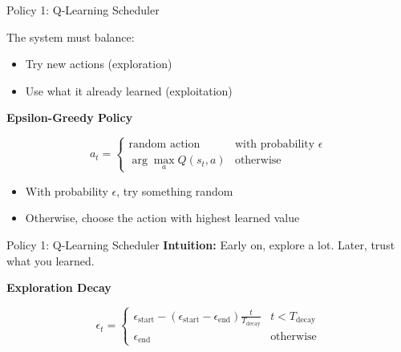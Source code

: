 \documentclass[Serif, 10pt, brown]{beamer}
\theoremstyle{example}
\theoremstyle{plain}
\begin{document}
\begin{frame}{Policy 1: Q-Learning Scheduler}

The system must balance:
\begin{itemize}
    \item Try new actions (exploration)
    \item Use what it already learned (exploitation)
\end{itemize}

\vspace{0.3cm}

\textbf{Epsilon-Greedy Policy}

\[
a_t =
\begin{cases}
\text{random action} & \text{with probability } \epsilon \\
\arg\max_{a} Q(s_t, a) & \text{otherwise}
\end{cases}
\]

\begin{itemize}
    \item With probability $\epsilon$, try something random
    \item Otherwise, choose the action with highest learned value
\end{itemize}

\end{frame}

\begin{frame}{Policy 1: Q-Learning Scheduler}
\textbf{Intuition:}
Early on, explore a lot.
Later, trust what you learned.


\textbf{Exploration Decay}

\[
\epsilon_t =
\begin{cases}
\epsilon_{\text{start}} -
(\epsilon_{\text{start}} - \epsilon_{\text{end}})
\frac{t}{T_{\text{decay}}}
& t < T_{\text{decay}} \\
\epsilon_{\text{end}} & \text{otherwise}
\end{cases}
\]


\end{frame}
\end{document}
